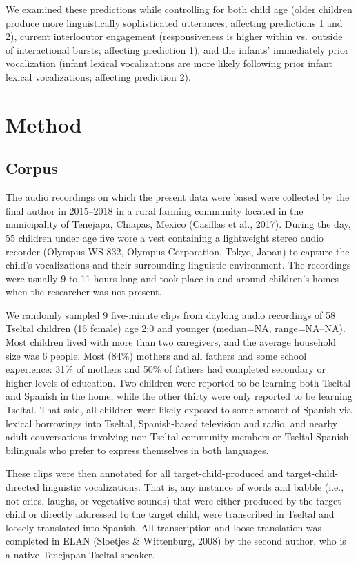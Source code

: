 \documentclass[
  man]{apa6}
\begin{document}
We examined these predictions while controlling for both child age (older children produce more linguistically sophisticated utterances; affecting predictions 1 and 2), current interlocutor engagement (responsiveness is higher within vs.~outside of interactional bursts; affecting prediction 1), and the infants' immediately prior vocalization (infant lexical vocalizations are more likely following prior infant lexical vocalizations; affecting prediction 2).

\hypertarget{method}{%
\section{Method}\label{method}}

\hypertarget{corpus}{%
\subsection{Corpus}\label{corpus}}

The audio recordings on which the present data were based were collected by the final author in 2015--2018 in a rural farming community located in the municipality of Tenejapa, Chiapas, Mexico (Casillas et al., 2017). During the day, 55 children under age five wore a vest containing a lightweight stereo audio recorder (Olympus WS-832, Olympus Corporation, Tokyo, Japan) to capture the child's vocalizations and their surrounding linguistic environment. The recordings were usually 9 to 11 hours long and took place in and around children's homes when the researcher was not present.

We randomly sampled 9 five-minute clips from daylong audio recordings of 58 Tseltal children (16 female) age 2;0 and younger (median=NA, range=NA--NA). Most children lived with more than two caregivers, and the average household size was 6 people. Most (84\%) mothers and all fathers had some school experience: 31\% of mothers and 50\% of fathers had completed secondary or higher levels of education. Two children were reported to be learning both Tseltal and Spanish in the home, while the other thirty were only reported to be learning Tseltal. That said, all children were likely exposed to some amount of Spanish via lexical borrowings into Tseltal, Spanish-based television and radio, and nearby adult conversations involving non-Tseltal community members or Tseltal-Spanish bilinguals who prefer to express themselves in both languages.

These clips were then annotated for all target-child-produced and target-child-directed linguistic vocalizations. That is, any instance of words and babble (i.e., not cries, laughs, or vegetative sounds) that were either produced by the target child or directly addressed to the target child, were transcribed in Tseltal and loosely translated into Spanish. All transcription and loose translation was completed in ELAN (Sloetjes \& Wittenburg, 2008) by the second author, who is a native Tenejapan Tseltal speaker.
\end{document}
